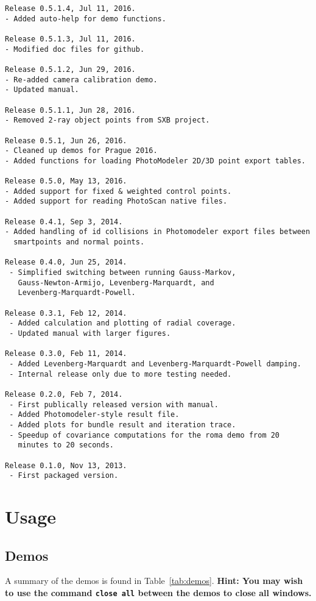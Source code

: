 \documentclass{article}
\begin{document}
\begin{verbatim}
Release 0.5.1.4, Jul 11, 2016.
- Added auto-help for demo functions.

Release 0.5.1.3, Jul 11, 2016.
- Modified doc files for github.

Release 0.5.1.2, Jun 29, 2016.
- Re-added camera calibration demo.
- Updated manual.

Release 0.5.1.1, Jun 28, 2016.
- Removed 2-ray object points from SXB project.

Release 0.5.1, Jun 26, 2016.
- Cleaned up demos for Prague 2016.
- Added functions for loading PhotoModeler 2D/3D point export tables.

Release 0.5.0, May 13, 2016.
- Added support for fixed & weighted control points.
- Added support for reading PhotoScan native files.

Release 0.4.1, Sep 3, 2014.
- Added handling of id collisions in Photomodeler export files between 
  smartpoints and normal points.

Release 0.4.0, Jun 25, 2014.
 - Simplified switching between running Gauss-Markov,
   Gauss-Newton-Armijo, Levenberg-Marquardt, and
   Levenberg-Marquardt-Powell.

Release 0.3.1, Feb 12, 2014.
 - Added calculation and plotting of radial coverage.
 - Updated manual with larger figures.

Release 0.3.0, Feb 11, 2014.
 - Added Levenberg-Marquardt and Levenberg-Marquardt-Powell damping.
 - Internal release only due to more testing needed.

Release 0.2.0, Feb 7, 2014.
 - First publically released version with manual.
 - Added Photomodeler-style result file.
 - Added plots for bundle result and iteration trace.
 - Speedup of covariance computations for the roma demo from 20
   minutes to 20 seconds.

Release 0.1.0, Nov 13, 2013.
 - First packaged version.
\end{verbatim}

\newpage
\section{Usage}
\label{sec:org5d59fdc}
\subsection{Demos}
\label{sec:demos}
A summary of the demos is found in Table~\ref{tab:demos}.
\textbf{Hint: You may wish to use the command \texttt{close all} between the demos to close
all windows.}
\end{document}
